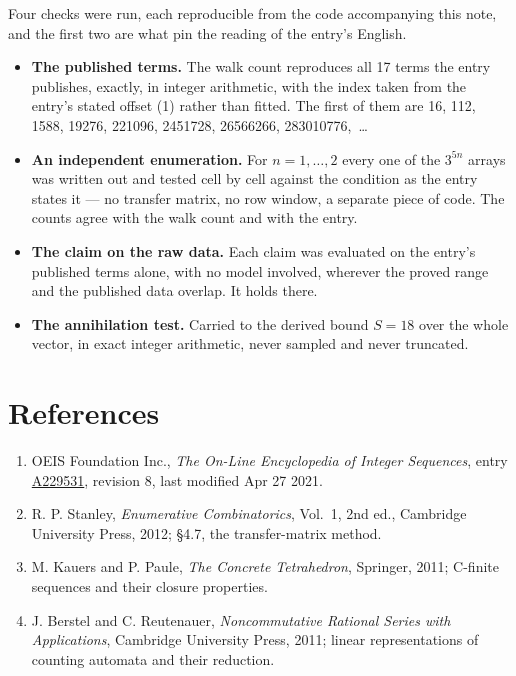 \documentclass[11pt]{article}
\theoremstyle{definition}
\begin{document}
Four checks were run, each reproducible from the code accompanying this note, and the first two are what pin the reading of the entry's English.

\begin{itemize}

\item {\bfseries The published terms.} The walk count reproduces all 17 terms the entry publishes, exactly, in integer arithmetic, with the index taken from the entry's stated offset (1) rather than fitted. The first of them are 16, 112, 1588, 19276, 221096, 2451728, 26566266, 283010776,~\dots

\item {\bfseries An independent enumeration.} For $n = 1,\dots,2$ every one of the $3^{5n}$ arrays was written out and tested cell by cell against the condition as the entry states it --- no transfer matrix, no row window, a separate piece of code. The counts agree with the walk count and with the entry.

\item {\bfseries The claim on the raw data.} Each claim was evaluated on the entry's published terms alone, with no model involved, wherever the proved range and the published data overlap. It holds there.

\item {\bfseries The annihilation test.} Carried to the derived bound $S = 18$ over the whole vector, in exact integer arithmetic, never sampled and never truncated.

\end{itemize}

\section{References}

\begin{enumerate}

\item OEIS Foundation Inc., \emph{The On-Line Encyclopedia of Integer Sequences}, entry \href{https://oeis.org/A229531}{A229531}, revision 8, last modified Apr 27 2021.

\item R. P. Stanley, \emph{Enumerative Combinatorics}, Vol.~1, 2nd ed., Cambridge University Press, 2012; \S4.7, the transfer-matrix method.

\item M. Kauers and P. Paule, \emph{The Concrete Tetrahedron}, Springer, 2011; C-finite sequences and their closure properties.

\item J. Berstel and C. Reutenauer, \emph{Noncommutative Rational Series with Applications}, Cambridge University Press, 2011; linear representations of counting automata and their reduction.

\end{enumerate}
\end{document}
